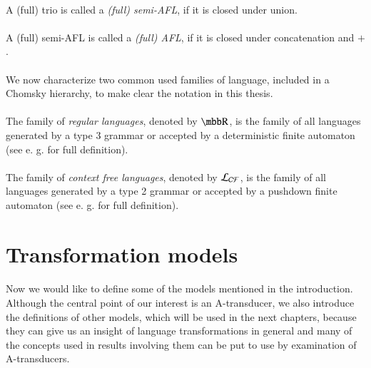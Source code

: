 \paragraph{}
 A (full) trio is called a \emph{(full) semi-AFL}, if it is closed under union.

\paragraph{}
 A (full) semi-AFL is called a \emph{(full) AFL}, if it is closed under concatenation and $+$.

\paragraph{}
We now characterize two common used families of language, included in a Chomsky hierarchy, to make clear the notation in this thesis.

\paragraph{}
\oznacenie The family of \emph{regular languages}, denoted by $\R $, is the family of all languages generated by a type 3 grammar or accepted by a deterministic finite automaton (see e. g. \cite{hopcroft:fola} for full definition).

\paragraph{}
\oznacenie The family of \emph{context free languages}, denoted by $\CF $, is the family of all languages generated by a type 2 grammar or accepted by a pushdown finite automaton (see e. g. \cite{hopcroft:fola} for full definition).

\section{Transformation models}
\paragraph{}
Now we would like to define some of the models mentioned in the introduction. Although the central point of our interest is an A-transducer, we also introduce the definitions of other models, which will be used in the next chapters, because they can give us an insight of language transformations in general and many of the concepts used in results involving them can be put to use by examination of A-transducers.

